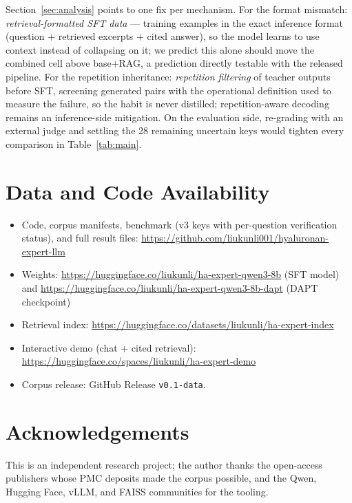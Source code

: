 \documentclass[11pt]{article}
\begin{document}
Section~\ref{sec:analysis} points to one fix per mechanism. For the
format mismatch: \emph{retrieval-formatted SFT data} --- training
examples in the exact inference format (question + retrieved excerpts +
cited answer), so the model learns to use context instead of
collapsing on it; we predict this alone should move the combined cell
above base+RAG, a prediction directly testable with the released
pipeline. For the repetition inheritance: \emph{repetition filtering}
of teacher outputs before SFT, screening generated pairs with the
operational definition used to measure the failure, so the habit is never
distilled; repetition-aware decoding remains an inference-side
mitigation. On the evaluation side, re-grading with an external judge
and settling the 28 remaining uncertain keys would tighten every
comparison in Table~\ref{tab:main}.

\section{Data and Code Availability}
\label{sec:availability}

\begin{itemize}
\item Code, corpus manifests, benchmark (v3 keys with per-question
verification status), and full result files:
\url{https://github.com/liukunli001/hyaluronan-expert-llm}
\item Weights: \url{https://huggingface.co/liukunli/ha-expert-qwen3-8b}
(SFT model) and
\url{https://huggingface.co/liukunli/ha-expert-qwen3-8b-dapt} (DAPT
checkpoint)
\item Retrieval index:
\url{https://huggingface.co/datasets/liukunli/ha-expert-index}
\item Interactive demo (chat + cited retrieval):
\url{https://huggingface.co/spaces/liukunli/ha-expert-demo}
\item Corpus release: GitHub Release \texttt{v0.1-data}.
\end{itemize}

\section*{Acknowledgements}

This is an independent research project; the author thanks the open-access
publishers whose PMC deposits made the corpus possible, and the Qwen,
Hugging Face, vLLM, and FAISS communities for the tooling.
\end{document}

